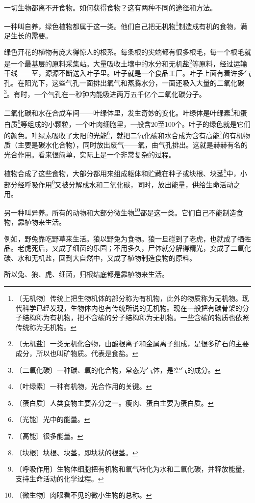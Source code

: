\documentclass[12pt,UTF-8,openany]{ctexbook}
\begin{document}
\begin{large}
    
    一切生物都离不开食物。如何获得食物？这有两种不同的途径和方法。
    
    一种叫自养，绿色植物都属于这一类。他们自己把无机物\footnote{〔无机物〕传统上把生物机体的部分称为有机物，此外的物质称为无机物。现代科学已经发现，生物体内也有传统所说的无机物。现在一般把有碳骨架的分子结构称为有机物，把不含碳的分子结构称为无机物。一些含碳的物质也依照传统称为无机物。}制造成有机的食物，满足生长的需要。
    
    绿色开花的植物有庞大得惊人的根系。每条根的尖端都有很多根毛，每一个根毛就是一个最基层的原料采集站。大量吸收土壤中的水分和无机盐\footnote{〔无机盐〕一类无机化合物，由酸根离子和金属离子组成，是很多矿石的主要成分，所以也叫矿物质。代表是食盐。}等原料，经过运输干线——茎，源源不断送入叶子里。叶子就是一个食品工厂。叶子上面有着许多气孔。在阳光下，这些气孔一面排出氧气和蒸腾水分，一面还吸入大量的二氧化碳\footnote{〔二氧化碳〕一种碳、氧的化合物，常态为气体，是空气的成分。}。有时，一个气孔在一秒钟内能吸进两万五千亿个二氧化碳分子。
    
    二氧化碳和水在合成车间——叶绿体里，发生奇妙的变化。叶绿体是叶绿素\footnote{〔叶绿素〕一种有机物，光合作用的关键。}和蛋白质\footnote{〔蛋白质〕人类食物主要养分之一。瘦肉、蛋白主要为蛋白质。}等组成的小颗粒，一个叶肉细胞里，一般含20至100个。叶子的绿色就是它们的颜色。叶绿素吸收了太阳的光能\footnote{〔光能〕光中的能量。}，就把二氧化碳和水合成为含有高能\footnote{〔高能〕很多能量。}的有机物质（主要是碳水化合物），同时放出废气——氧，由气孔排出。这就是赫赫有名的光合作用。看来很简单，实际上是一个非常复杂的过程。
    
    植物合成了这些食物，大部分都用来组成躯体和贮藏在种子或块根、块茎\footnote{〔块根〕块根、块茎，即块状的根茎。}中，小部分经呼吸作用\footnote{〔呼吸作用〕生物体细胞把有机物和氧气转化为水和二氧化碳，并释放能量，支持生命活动的化学过程。}又被分解成水和二氧化碳，同时，放出能量，供给生命活动之用。
    
    另一种叫异养。所有的动物和大部分微生物\footnote{〔微生物〕肉眼看不见的微小生物的总称。}都是这一类。它们自己不能制造食物，靠植物来生活。
    
    例如，野兔靠吃野草来生活。狼以野兔为食物。狼一旦碰到了老虎，也就成了牺牲品。老虎死后，又成了细菌的乐园；不用多久，尸体就分解得精光，变成了二氧化碳、水和无机盐，回到大自然中，又成了植物制造食物的原料。
    
    所以兔、狼、虎、细菌，归根结底都是靠植物来生活。
    

\end{large}
\end{document}
